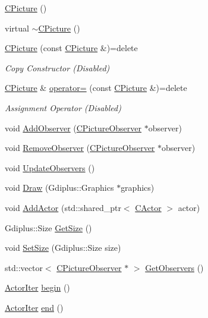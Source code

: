 \begin{DoxyCompactItemize}
\item 
\hyperlink{class_c_picture_a4e3783bef1f9d565b8a9f5e9680685ab}{C\+Picture} ()
\item 
virtual \hyperlink{class_c_picture_a763d6f41025f8e3f39c3ed264aac623c}{$\sim$\+C\+Picture} ()
\item 
\hypertarget{class_c_picture_aa74c697e3bcca50430acbfa582f7a928}{}\hyperlink{class_c_picture_aa74c697e3bcca50430acbfa582f7a928}{C\+Picture} (const \hyperlink{class_c_picture}{C\+Picture} \&)=delete\label{class_c_picture_aa74c697e3bcca50430acbfa582f7a928}

\begin{DoxyCompactList}\small\item\em Copy Constructor (Disabled) \end{DoxyCompactList}\item 
\hypertarget{class_c_picture_a8b0fe5e8e17f415d010eedab79555b6e}{}\hyperlink{class_c_picture}{C\+Picture} \& \hyperlink{class_c_picture_a8b0fe5e8e17f415d010eedab79555b6e}{operator=} (const \hyperlink{class_c_picture}{C\+Picture} \&)=delete\label{class_c_picture_a8b0fe5e8e17f415d010eedab79555b6e}

\begin{DoxyCompactList}\small\item\em Assignment Operator (Disabled) \end{DoxyCompactList}\item 
void \hyperlink{class_c_picture_a6be8632e9b1c468dcf27e8452baf5605}{Add\+Observer} (\hyperlink{class_c_picture_observer}{C\+Picture\+Observer} $\ast$observer)
\item 
void \hyperlink{class_c_picture_a548ad72979b2a11c2669d9896f32bf92}{Remove\+Observer} (\hyperlink{class_c_picture_observer}{C\+Picture\+Observer} $\ast$observer)
\item 
void \hyperlink{class_c_picture_a971ca9c9100725b7d1a900adcfe889d6}{Update\+Observers} ()
\item 
void \hyperlink{class_c_picture_aca6a4829388fdfe3ecdc42f0e788b712}{Draw} (Gdiplus\+::\+Graphics $\ast$graphics)
\item 
void \hyperlink{class_c_picture_a90799f3ea10ffea8fbb0ea2b9d24a525}{Add\+Actor} (std\+::shared\+\_\+ptr$<$ \hyperlink{class_c_actor}{C\+Actor} $>$ actor)
\item 
Gdiplus\+::\+Size \hyperlink{class_c_picture_af2677c395a3cb8d6e7d0860839801e5b}{Get\+Size} ()
\item 
void \hyperlink{class_c_picture_a66b8de27d3435e19024307254e918e3a}{Set\+Size} (Gdiplus\+::\+Size size)
\item 
std\+::vector$<$ \hyperlink{class_c_picture_observer}{C\+Picture\+Observer} $\ast$ $>$ \hyperlink{class_c_picture_ac4785e47f611cd9d32bb3c329d7a1b9c}{Get\+Observers} ()
\item 
\hyperlink{class_c_picture_1_1_actor_iter}{Actor\+Iter} \hyperlink{class_c_picture_a8461cc11cc1ce334b4cf92e2ee4a4ebe}{begin} ()
\item 
\hyperlink{class_c_picture_1_1_actor_iter}{Actor\+Iter} \hyperlink{class_c_picture_a63840c7eff74388a204c750908a23933}{end} ()
\end{DoxyCompactItemize}


